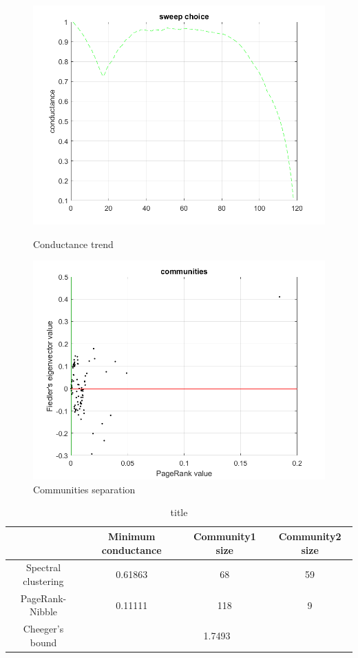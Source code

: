 \documentclass[12pt,a4paper]{article}
\begin{document}
\begin{figure}
\centering
\begin{minipage}{.47\textwidth}
  \includegraphics[width = \textwidth]{img/condNibble}
  \caption{Conductance trend}
  \label{fig:condNibble}
\end{minipage}
\begin{minipage}{.47\textwidth}
  \includegraphics[width = \textwidth]{img/CommunitiesNibble}
  \caption{Communities separation}
  \label{fig:fiedlerNibble}
\end{minipage}
\end{figure}

\begin{table}
\centering
\begin{tabular}{cccc}
\toprule
                    & Minimum conductance & Community1 size & Community2 size\\
                    \midrule
Spectral clustering &   0.61863           & 68              & 59\\
PageRank-Nibble     &   0.11111           & 118             & 9\\
\midrule
Cheeger's bound     & \multicolumn{3}{c}{1.7493}\\
\bottomrule
\end{tabular}
  \caption{title}
  \label{tab:cond}
\end{table}
\end{document}
